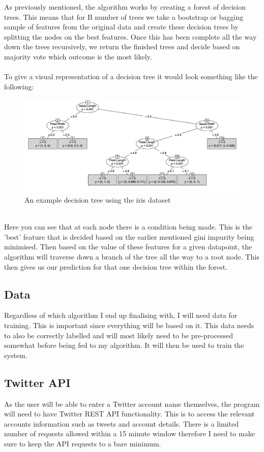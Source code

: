 As previously mentioned, the algorithm works by creating a forest of decision trees. This means that for B number of trees we take a bootstrap or bagging sample of features from the original data and create these decision trees by splitting the nodes on the best features. Once this has been complete all the way down the trees recursively, we return the finished trees and decide based on majority vote which outcome is the most likely. 
\\
\\
\clearpage
To give a visual representation of a decision tree it would look something like the following:
\begin{figure}[h]
	\includegraphics[width=150mm]{figures/tree}
	\caption{An example decision tree using the iris dataset}
\end{figure}
\\
Here you can see that at each node there is a condition being made. This is the 'best' feature that is decided based on the earlier mentioned gini impurity being minimised. Then based on the value of these features for a given datapoint, the algorithm will traverse down a branch of the tree all the way to a root node. This then gives us our prediction for that one decision tree within the forest. 

\subsection{Data}
Regardless of which algorithm I end up finalising with, I will need data for training. This is important since everything will be based on it. This data needs to also be correctly labelled and will most likely need to be pre-processed somewhat before being fed to my algorithm. It will then be used to train the system.

\subsection{Twitter API}
As the user will be able to enter a Twitter account name themselves, the program will need to have Twitter REST API functionality. This is to access the relevant accounts information such as tweets and account details. There is a limited number of requests allowed within a 15 minute window therefore I need to make sure to keep the API requests to a bare minimum. 


